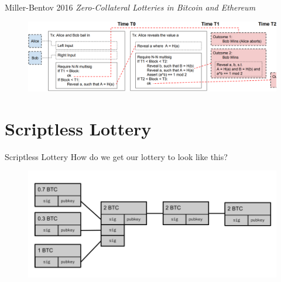 \documentclass{beamer}
\begin{document}

\begin{frame}{Miller-Bentov 2016}
    \textit{Zero-Collateral Lotteries in Bitcoin and Ethereum}
    \begin{figure}
        \centering
        \includegraphics[width=\textwidth]{miller-bentov.png}
    \end{figure}
\end{frame}

\section{Scriptless Lottery}
\begin{frame}{Scriptless Lottery}
How do  we get our lottery to look like this?
\begin{figure}
    \centering
    \includegraphics[width=\textwidth]{chain_view_2.png}
\end{figure}
\end{frame}

\end{document}
